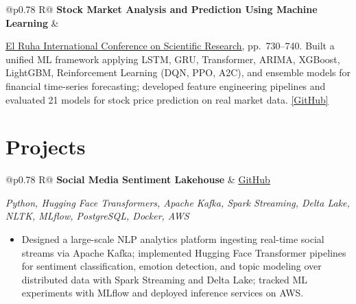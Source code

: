 \documentclass[a4paper,10pt]{article}
\newcommand{\ulink}[2]{\href{#1}{\uline{#2}}}
\newcommand{\subheading}[1]{{\color[HTML]{0A0A0A}\fontsize{12}{14}\selectfont\bfseries #1}}
\newcommand{\techstack}[1]{{\color[HTML]{5C5C5C}\fontsize{10.5}{12.5}\selectfont\itshape #1}}
\newcommand{\meta}[1]{{\color[HTML]{5C5C5C}\fontsize{10.5}{12.5}\selectfont #1}}
\begin{document}
\begin{tabularx}{\linewidth}{@{}p{0.78\linewidth} R@{}}
\subheading{Stock Market Analysis and Prediction Using Machine Learning} & \meta{2025}
\end{tabularx}
\vspace{1pt}
{\color[HTML]{0A0A0A}\fontsize{11}{14}\selectfont
\ulink{https://www.elruha.org/_files/ugd/614b1f_6b95e1b697bf452b9907ba46e0151c05.pdf\#page=774}{El Ruha International Conference on Scientific Research}, pp.\ 730--740. Built a unified ML framework applying LSTM, GRU, Transformer, ARIMA, XGBoost, LightGBM, Reinforcement Learning (DQN, PPO, A2C), and ensemble models for financial time-series forecasting; developed feature engineering pipelines and evaluated 21 models for stock price prediction on real market data. \ulink{https://github.com/su-jin1425/Set-Project}{[GitHub]}}

\vspace{2pt}

\section{Projects}
\vspace{2pt}

\begin{tabularx}{\linewidth}{@{}p{0.78\linewidth} R@{}}
\subheading{Social Media Sentiment Lakehouse} & \meta{\ulink{https://github.com/su-jin1425/Social-Media-Sentiment-Lakehouse}{GitHub}}
\end{tabularx}
\vspace{1pt}
\techstack{Python, Hugging Face Transformers, Apache Kafka, Spark Streaming, Delta Lake, NLTK, MLflow, PostgreSQL, Docker, AWS}
\begin{itemize}[nosep, leftmargin=1.5em, itemsep=1pt, topsep=2pt]
\item {\color[HTML]{0A0A0A}\fontsize{11}{14}\selectfont
Designed a large-scale NLP analytics platform ingesting real-time social streams via Apache Kafka; implemented Hugging Face Transformer pipelines for sentiment classification, emotion detection, and topic modeling over distributed data with Spark Streaming and Delta Lake; tracked ML experiments with MLflow and deployed inference services on AWS.}
\end{itemize}

\vspace{2pt}
\end{document}
